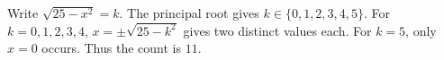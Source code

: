Write $\sqrt{25-x^2}=k$. The principal root gives $k\in\{0,1,2,3,4,5\}$. For $k=0,1,2,3,4$, $x=\pm\sqrt{25-k^2}$ gives two distinct values each. For $k=5$, only $x=0$ occurs. Thus the count is $\boxed{11}$.
